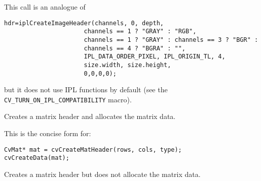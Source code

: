 \begin{description}
\end{description}

This call is an analogue of
\begin{lstlisting}
hdr=iplCreateImageHeader(channels, 0, depth,
                      channels == 1 ? "GRAY" : "RGB",
                      channels == 1 ? "GRAY" : channels == 3 ? "BGR" :
                      channels == 4 ? "BGRA" : "",
                      IPL_DATA_ORDER_PIXEL, IPL_ORIGIN_TL, 4,
                      size.width, size.height,
                      0,0,0,0);
\end{lstlisting}
but it does not use IPL functions by default (see the \texttt{CV\_TURN\_ON\_IPL\_COMPATIBILITY} macro).

\label{cvCreateMat}
Creates a matrix header and allocates the matrix data. 


\begin{description}
\end{description}

This is the concise form for:

\begin{lstlisting}
CvMat* mat = cvCreateMatHeader(rows, cols, type);
cvCreateData(mat);
\end{lstlisting}

Creates a matrix header but does not allocate the matrix data.



